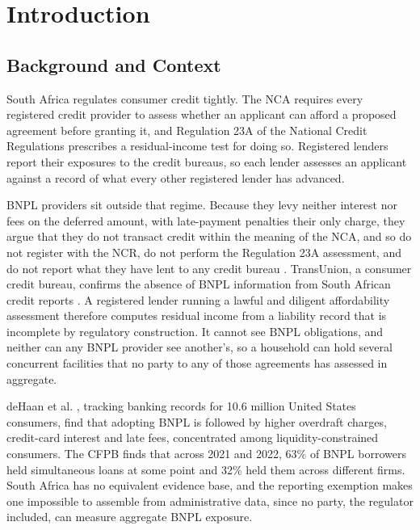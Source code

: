 \section{Introduction}
\label{ch:introduction}

\subsection{Background and Context}
\label{sec:background}

South Africa regulates consumer credit tightly. The \ac{NCA} \cite{sa_nca_2005} requires every
registered credit provider to assess whether an applicant can afford a proposed agreement before
granting it, and Regulation 23A of the National Credit Regulations
\cite{sa_ncr_affordability_2015} prescribes a residual-income test for doing so. Registered lenders
report their exposures to the credit bureaus, so each lender assesses an applicant against a record
of what every other registered lender has advanced.

\ac{BNPL} providers sit outside that regime. Because they levy neither interest nor fees on the
deferred amount, with late-payment penalties their only charge, they argue that they do not
transact credit within the meaning of the \ac{NCA}, and
so do not register with the \ac{NCR}, do not perform the Regulation 23A assessment, and do not
report what they have lent to any credit bureau \cite{nortonrose_bnpl_sa}. TransUnion, a consumer
credit bureau, confirms the absence of \ac{BNPL} information from South African credit reports
\cite{transunion_cps_sa_2025}. A registered lender running a lawful and diligent affordability
assessment therefore computes residual income from a liability record that is incomplete by
regulatory construction. It cannot see \ac{BNPL} obligations, and neither can any \ac{BNPL} provider
see another's, so a household can hold several concurrent facilities that no party to any of those
agreements has assessed in aggregate.

deHaan et al. \cite{dehaan2024bnpl}, tracking banking
records for 10.6 million United States consumers, find that adopting \ac{BNPL} is followed by higher
overdraft charges, credit-card interest and late fees, concentrated among liquidity-constrained
consumers. The \ac{CFPB} \cite{cfpb2025bnpl} finds that across 2021 and 2022, 63\% of \ac{BNPL}
borrowers held simultaneous loans at some point and 32\% held them across different firms. South
Africa has no equivalent evidence base, and the reporting exemption makes one impossible to
assemble from administrative data, since no party, the regulator included, can measure aggregate
\ac{BNPL} exposure.

